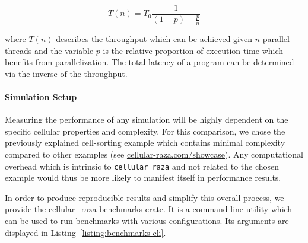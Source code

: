 \documentclass[fontsize=11pt,a4paper]{article}
\begin{document}
\begin{equation}
    T(n) = T_0\frac{1}{(1-p) + \frac{p}{n}}
    \label{eq:amdahls-law}
\end{equation}

where $T(n)$ describes the throughput which can be achieved given $n$ parallel threads and the
variable $p$ is the relative proportion of execution time which benefits from parallelization.
The total latency of a program can be determined via the inverse of the throughput.

\paragraph{Simulation Setup}
Measuring the performance of any simulation will be highly dependent on the specific cellular 
properties and complexity.
For this comparison, we chose the previously explained cell-sorting example which contains minimal
complexity compared to other examples (see
\href{https://cellular-raza.com/showcase}{cellular-raza.com/showcase}).
Any computational overhead which is intrinsic to \texttt{cellular\_raza} and not related to the
chosen example would thus be more likely to manifest itself in performance results.

In order to produce reproducible results and simplify this overall process, we provide the
\href{https://github.com/jonaspleyer/cellular_raza/tree/master/cellular_raza-benchmarks}{cellular\_raza-benchmarks} crate.
It is a command-line utility which can be used to run benchmarks with various configurations.
Its arguments are displayed in Listing~\ref{listing:benchmarks-cli}.
\end{document}
